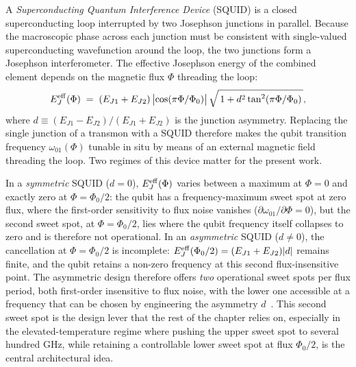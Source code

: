 A \emph{Superconducting Quantum Interference Device} (SQUID) is a closed superconducting loop interrupted by two Josephson junctions in parallel. Because the macroscopic phase across each junction must be consistent with single-valued superconducting wavefunction around the loop, the two junctions form a Josephson interferometer. The effective Josephson energy of the combined element depends on the magnetic flux $\Phi$ threading the loop:
\begin{equation}
    E_J^{\rm eff}(\Phi)
    \;=\;
    (E_{J1}+E_{J2})\,\bigl|\cos(\pi\Phi/\Phi_0)\bigr|\,
    \sqrt{\,1+d^2\tan^2(\pi\Phi/\Phi_0)\,},
    \label{eq:effective_EJ_squid}
\end{equation}
where $d \equiv (E_{J1}-E_{J2})/(E_{J1}+E_{J2})$ is the junction asymmetry. Replacing the single junction of a transmon with a SQUID therefore makes the qubit transition frequency $\omega_{01}(\Phi)$ tunable in situ by means of an external magnetic field threading the loop. Two regimes of this device matter for the present work.

In a \emph{symmetric} SQUID ($d=0$), $E_J^{\rm eff}(\Phi)$ varies between a maximum at $\Phi=0$ and exactly zero at $\Phi=\Phi_0/2$: the qubit has a frequency-maximum sweet spot at zero flux, where the first-order sensitivity to flux noise vanishes ($\partial \omega_{01}/\partial\Phi = 0$), but the second sweet spot, at $\Phi=\Phi_0/2$, lies where the qubit frequency itself collapses to zero and is therefore not operational. In an \emph{asymmetric} SQUID ($d \neq 0$), the cancellation at $\Phi=\Phi_0/2$ is incomplete: $E_J^{\rm eff}(\Phi_0/2) = (E_{J1}+E_{J2}) |d|$ remains finite, and the qubit retains a non-zero frequency at this second flux-insensitive point. The asymmetric design therefore offers \emph{two} operational sweet spots per flux period, both first-order insensitive to flux noise, with the lower one accessible at a frequency that can be chosen by engineering the asymmetry $d$~\cite{Hutchings2017}. This second sweet spot is the design lever that the rest of the chapter relies on, especially in the elevated-temperature regime where pushing the upper sweet spot to several hundred GHz, while retaining a controllable lower sweet spot at flux $\Phi_0/2$, is the central architectural idea.

